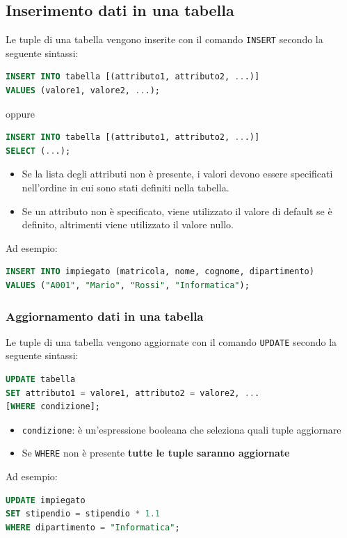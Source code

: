 \documentclass[a4paper,twoside]{article}
\begin{document}
\subsection{Inserimento dati in una tabella}
Le tuple di una tabella vengono inserite con il comando \texttt{INSERT} secondo
la seguente sintassi:
\begin{lstlisting}[language=SQL, numbers=none]
INSERT INTO tabella [(attributo1, attributo2, ...)]
VALUES (valore1, valore2, ...);
\end{lstlisting}
oppure
\begin{lstlisting}[language=SQL, numbers=none]
INSERT INTO tabella [(attributo1, attributo2, ...)]
SELECT (...);
\end{lstlisting}
\begin{itemize}
  \item Se la lista degli attributi non è presente, i valori devono essere specificati
    nell'ordine in cui sono stati definiti nella tabella.

  \item Se un attributo non è specificato, viene utilizzato il valore di default se
    è definito, altrimenti viene utilizzato il valore nullo.
\end{itemize}
Ad esempio:
\begin{lstlisting}[language=SQL, numbers=none]
INSERT INTO impiegato (matricola, nome, cognome, dipartimento)
VALUES ("A001", "Mario", "Rossi", "Informatica");
\end{lstlisting}

\subsubsection{Aggiornamento dati in una tabella}
Le tuple di una tabella vengono aggiornate con il comando \texttt{UPDATE} secondo
la seguente sintassi:
\begin{lstlisting}[language=SQL, numbers=none]
UPDATE tabella
SET attributo1 = valore1, attributo2 = valore2, ...
[WHERE condizione];
\end{lstlisting}
\begin{itemize}
  \item \texttt{condizione}: è un'espressione booleana che seleziona quali tuple aggiornare
  \item Se \texttt{WHERE} non è presente \textbf{tutte le tuple saranno aggiornate}
\end{itemize}
Ad esempio:
\begin{lstlisting}[language=SQL, numbers=none]
UPDATE impiegato
SET stipendio = stipendio * 1.1
WHERE dipartimento = "Informatica";
\end{lstlisting}
\end{document}
